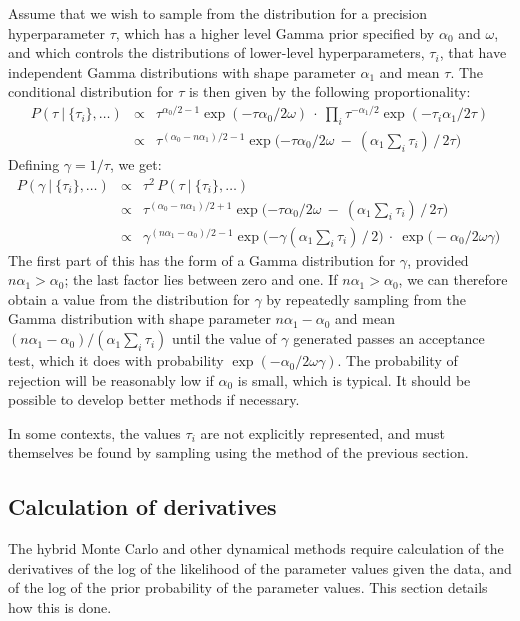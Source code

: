 \documentclass{report}[11pt]
\def\beq{\begin{eqnarray}}
\def\eeq{\end{eqnarray}}
\begin{document}
Assume that we wish to sample from the distribution for a precision
hyperparameter $\tau$, which has a higher level Gamma prior specified
by $\alpha_0$ and $\omega$, and which controls the distributions of
lower-level hyperparameters, $\tau_i$, that have independent Gamma
distributions with shape parameter $\alpha_1$ and mean $\tau$.  The
conditional distribution for $\tau$ is then given by the following
proportionality:\beq
  P(\tau\ |\ \{\tau_i\}, \ldots) & \propto &
    \tau^{\alpha_0/2-1} \exp(-\tau\alpha_0/2\omega) \ \cdot\ 
    \prod_i \tau^{-\alpha_1/2} \exp(-\tau_i\alpha_1/2\tau) \\[3pt]
  & \propto &
    \tau^{(\alpha_0-n\alpha_1)/2-1} 
    \exp\Big({\textstyle-\tau\alpha_0/2\omega
           \ -\ (\alpha_1\sum\limits_i \tau_i)\,\big/\,2\tau}\Big)
\eeq%
Defining $\gamma=1/\tau$, we get:\beq
  P(\gamma\ |\ \{\tau_i\}, \ldots) & \propto & 
    \tau^2\,P(\tau\ |\ \{\tau_i\}, \ldots) \\[3pt]
  & \propto &
    \tau^{(\alpha_0-n\alpha_1)/2+1} 
    \exp\Big({\textstyle-\tau\alpha_0/2\omega
           \ -\ (\alpha_1\sum\limits_i \tau_i)\,\big/\,2\tau}\Big) \\[3pt]
  & \propto &
    \gamma^{(n\alpha_1-\alpha_0)/2-1} 
    \exp\Big({\textstyle -\gamma(\alpha_1\sum\limits_i \tau_i)\,\big/\,2}\Big)
    \ \cdot\ \exp\big(\!-\alpha_0/2\omega\gamma\big)\ 
\eeq%
The first part of this has the form of a Gamma distribution for
$\gamma$, provided $n\alpha_1>\alpha_0$; the last factor lies between
zero and one.  If $n\alpha_1>\alpha_0$, we can therefore obtain a
value from the distribution for $\gamma$ by repeatedly sampling from
the Gamma distribution with shape parameter $n\alpha_1\!-\!\alpha_0$
and mean $(n\alpha_1\!-\!\alpha_0)/(\alpha_1\sum\limits_i \tau_i)$
until the value of $\gamma$ generated passes an acceptance test,
which it does with probability $\exp(-\alpha_0/2\omega\gamma)$.  The
probability of rejection will be reasonably low if $\alpha_0$ is
small, which is typical.  It should be possible to develop better
methods if necessary.

In some contexts, the values $\tau_i$ are not explicitly represented,
and must themselves be found by sampling using the method of the
previous section.


\subsection*{Calculation of derivatives}

The hybrid Monte Carlo and other dynamical methods require calculation
of the derivatives of the log of the likelihood of the parameter
values given the data, and of the log of the prior probability of the
parameter values.  This section details how this is done.
\end{document}

